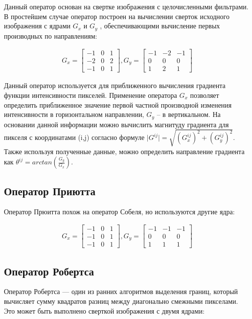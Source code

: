 Данный оператор основан на свертке изображения с целочисленными фильтрами. В простейшем случае оператор построен на вычислении сверток исходного изображения с ядрами \(G_x\) и \(G_y\) , обеспечивающими вычисление первых производных по направлениям:


\begin{gather}
G_{x}=
\begin{bmatrix} 
-1 & 0 & 1 \\ 
-2 & 0 & 2 \\ 
-1 & 0 & 1
\end{bmatrix},
G_{y}=
\begin{bmatrix}
-1 & -2 & -1 \\ 
0 & 0 & 0 \\ 
1 & 2 & 1
\end{bmatrix}
\end{gather}

Данный оператор используется для приближенного вычисления градиента функции интенсивности пикселей. Применение оператора \(G_{x}\) позволяет определить приближенное значение первой частной производной изменения интенсивности в горизонтальном направлении, \(G_{y}\) – в вертикальном. На основании данной информации можно вычислить магнитуду градиента для пикселя с координатами (i,j) согласно формуле \(\mid G^{ij} \mid = \sqrt{(G_{x}^{ij})^2 + (G_{y}^{ij})^2}\). Также используя полученные данные, можно определить направление градиента как \(\theta^{ij} = arctan\left( \frac{G_{y}}{G_{x}}\right)\).

\subsection{Оператор Приютта}
Оператор Прюитта похож на оператор Собеля, но используются другие ядра:

\begin{gather}
G_{x}=
\begin{bmatrix} 
-1 & 0 & 1 \\ 
-1 & 0 & 1 \\ 
-1 & 0 & 1
\end{bmatrix},
G_{y}=
\begin{bmatrix}
-1 & -1 & -1 \\ 
0 & 0 & 0 \\ 
1 & 1 & 1
\end{bmatrix}
\end{gather}

\subsection{Оператор Робертса}
Оператор Робертса — один из ранних алгоритмов выделения границ, который вычисляет сумму квадратов разниц между диагонально смежными пикселами. Это может быть выполнено сверткой изображения с двумя ядрами:


